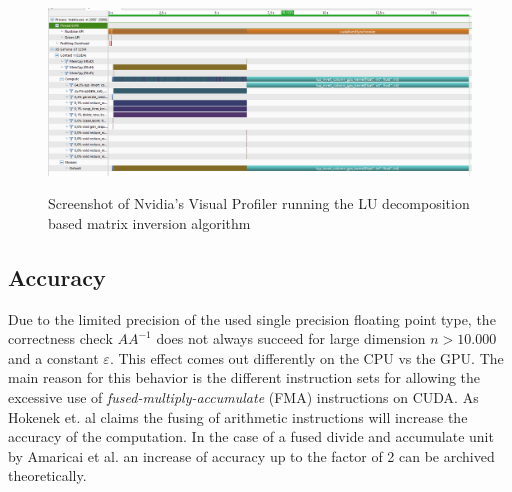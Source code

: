 \begin{figure}
	\includegraphics[width=18cm]{figs/nvprof.png}
	\centering
	\label{fig:nfprof}
	\caption{Screenshot of Nvidia's Visual Profiler running the LU decomposition based matrix inversion algorithm}
\end{figure}

\subsection*{Accuracy}
Due to the limited precision of the used single precision floating point type, the correctness check $AA^{-1}$ does not always succeed for large dimension $n > 10.000$ and a constant $\varepsilon$. This effect comes out differently on the CPU vs the GPU. The main reason for this behavior is the different instruction sets for allowing the excessive use of \emph{fused-multiply-accumulate} (FMA) instructions on CUDA. As Hokenek et. al \cite{Hokenek90} claims the fusing of arithmetic instructions will increase the accuracy of the computation. In the case of a fused divide and accumulate unit by Amaricai et al. \cite{Amaricai2010} an increase of accuracy up to the factor of 2 can be archived theoretically.
